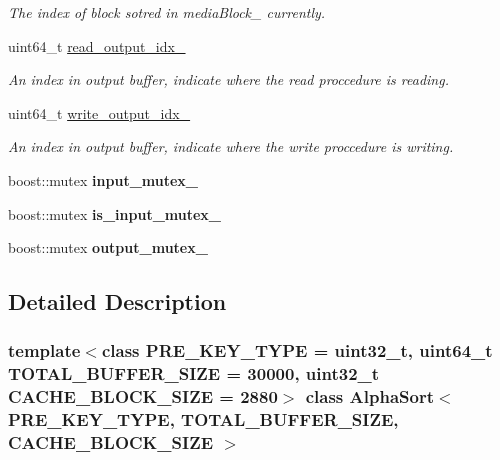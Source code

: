 \begin{CompactItemize}
\begin{CompactList}\small\item\em The index of block sotred in mediaBlock\_\- currently. \item\end{CompactList}\item 
\hypertarget{classAlphaSort_b94446cfbc0068e1cb2737a56ec5a034}{
uint64\_\-t \hyperlink{classAlphaSort_b94446cfbc0068e1cb2737a56ec5a034}{read\_\-output\_\-idx\_\-}}
\label{classAlphaSort_b94446cfbc0068e1cb2737a56ec5a034}

\begin{CompactList}\small\item\em An index in output buffer, indicate where the read proccedure is reading. \item\end{CompactList}\item 
\hypertarget{classAlphaSort_6c6babba2b02671ed859fa447db6331a}{
uint64\_\-t \hyperlink{classAlphaSort_6c6babba2b02671ed859fa447db6331a}{write\_\-output\_\-idx\_\-}}
\label{classAlphaSort_6c6babba2b02671ed859fa447db6331a}

\begin{CompactList}\small\item\em An index in output buffer, indicate where the write proccedure is writing. \item\end{CompactList}\item 
\hypertarget{classAlphaSort_8885de4d5f83e6c7f4de0bb8c6ac6bab}{
boost::mutex \textbf{input\_\-mutex\_\-}}
\label{classAlphaSort_8885de4d5f83e6c7f4de0bb8c6ac6bab}

\item 
\hypertarget{classAlphaSort_de4998c667a8b8a6ec14ce6abfda053a}{
boost::mutex \textbf{is\_\-input\_\-mutex\_\-}}
\label{classAlphaSort_de4998c667a8b8a6ec14ce6abfda053a}

\item 
\hypertarget{classAlphaSort_75712cbedf43e17729e9c05a25d39c7f}{
boost::mutex \textbf{output\_\-mutex\_\-}}
\label{classAlphaSort_75712cbedf43e17729e9c05a25d39c7f}

\end{CompactItemize}


\subsection{Detailed Description}
\subsubsection*{template$<$class PRE\_\-KEY\_\-TYPE = uint32\_\-t, uint64\_\-t TOTAL\_\-BUFFER\_\-SIZE = 30000, uint32\_\-t CACHE\_\-BLOCK\_\-SIZE = 2880$>$ class AlphaSort$<$ PRE\_\-KEY\_\-TYPE, TOTAL\_\-BUFFER\_\-SIZE, CACHE\_\-BLOCK\_\-SIZE $>$}

